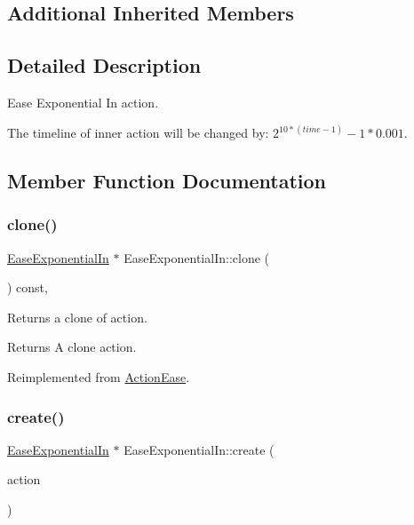 \subsection*{Additional Inherited Members}


\subsection{Detailed Description}
Ease Exponential In action. 

The timeline of inner action will be changed by\+: ${ 2 }^{ 10*(time-1) }-1*0.001$. 

\subsection{Member Function Documentation}
\mbox{\label{classEaseExponentialIn_a028a3801fc36418cf59018c457b8a102}} 
\subsubsection{\texorpdfstring{clone()}{clone()}}
{\footnotesize\ttfamily \hyperlink{classEaseExponentialIn}{Ease\+Exponential\+In} $\ast$ Ease\+Exponential\+In\+::clone (\begin{DoxyParamCaption}\item[{void}]{ }\end{DoxyParamCaption}) const\hspace{0.3cm}{\ttfamily [override]}, {\ttfamily [virtual]}}

Returns a clone of action.

\begin{DoxyReturn}{Returns}
A clone action. 
\end{DoxyReturn}


Reimplemented from \hyperlink{classActionEase_a39bec93fe161fb732a74d8e51a2fe08b}{Action\+Ease}.

\mbox{\label{classEaseExponentialIn_add0f518c7b323078d69de4433106294c}} 
\subsubsection{\texorpdfstring{create()}{create()}}
{\footnotesize\ttfamily \hyperlink{classEaseExponentialIn}{Ease\+Exponential\+In} $\ast$ Ease\+Exponential\+In\+::create (\begin{DoxyParamCaption}\item[{\hyperlink{classActionInterval}{Action\+Interval} $\ast$}]{action }\end{DoxyParamCaption})\hspace{0.3cm}{\ttfamily [static]}}



